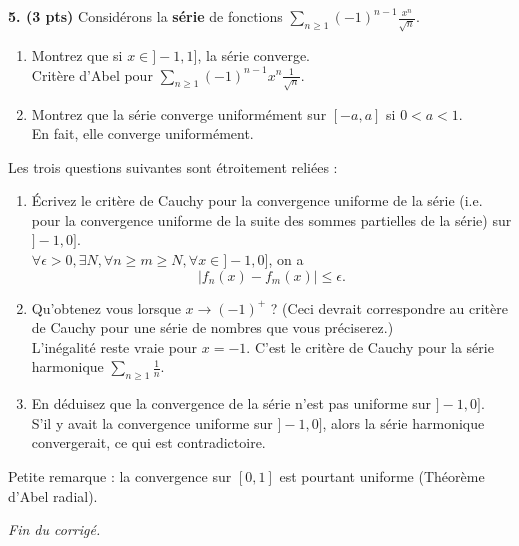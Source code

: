 \documentclass[a4paper,10pt]{article}
\newcommand{\abs}[1]{\left|#1\right|}
\newcommand{\correction}[1]{{\color{red}#1}}
\begin{document}



\vspace{.1in}

\noindent
\textbf{5. (3 pts)}
Considérons la \textbf{série} de fonctions $\sum_{n\geq1}(-1)^{n-1}\frac{x^n}{\sqrt{n}}$.
\begin{enumerate}[label=\alph*)]
    \item Montrez que si $x\in]-1,1]$, la série converge.\\
    \correction{Critère d'Abel pour $\sum_{n\geq1}(-1)^{n-1}x^n\frac{1}{\sqrt{n}}$.}
    \item Montrez que la série converge uniformément sur $[-a,a]$ si $0<a<1$.\\
    \correction{En fait, elle converge uniformément.}
\end{enumerate}
Les trois questions suivantes sont étroitement reliées :
\begin{enumerate}[resume*]
    \item Écrivez le critère de Cauchy pour la convergence uniforme de la série (i.e. pour la convergence uniforme de la suite des sommes partielles de la série) sur $]-1,0]$.\\
    \correction{$\forall \epsilon>0, \exists N, \forall n\geq m\geq N, \forall x\in ]-1,0]$, on a
    \[\tag{$\star$} \abs{f_n(x)-f_m(x)}\leq \epsilon.\]}
    \item Qu'obtenez vous lorsque $x\to(-1)^+$ ? (Ceci devrait correspondre au critère de Cauchy pour une série de nombres que vous préciserez.)\\
    \correction{L'inégalité reste vraie pour $x=-1$. C'est le critère de Cauchy pour la série harmonique $\sum_{n\geq1} \frac{1}{n}$.}
    \item En déduisez que la convergence de la série n'est pas uniforme sur $]-1,0]$.\\
    \correction{S'il y avait la convergence uniforme sur $]-1,0]$, alors la série harmonique convergerait, ce qui est contradictoire.}
\end{enumerate}
Petite remarque : la convergence sur $[0,1]$ est pourtant uniforme (Théorème d'Abel radial).

\vfill

\centering\emph{Fin du corrigé.}
\end{document}
